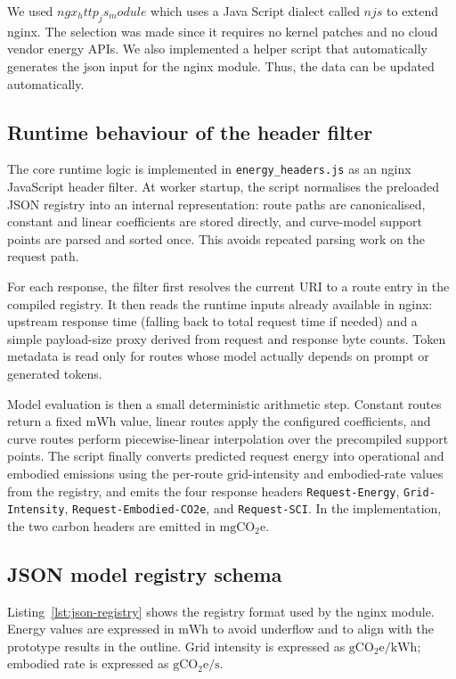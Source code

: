 We used $ngx_http_js_module$ which uses a Java Script dialect called $njs$ to extend nginx. The selection was made since it requires no kernel patches and no cloud vendor energy APIs. We also implemented a helper script that automatically generates the json input for the nginx module. Thus, the data can be updated automatically.

\subsection{Runtime behaviour of the header filter}
The core runtime logic is implemented in \texttt{energy\_headers.js} as an nginx JavaScript header filter. At worker startup, the script normalises the preloaded JSON registry into an internal representation: route paths are canonicalised, constant and linear coefficients are stored directly, and curve-model support points are parsed and sorted once. This avoids repeated parsing work on the request path.

For each response, the filter first resolves the current URI to a route entry in the compiled registry. It then reads the runtime inputs already available in nginx: upstream response time (falling back to total request time if needed) and a simple payload-size proxy derived from request and response byte counts. Token metadata is read only for routes whose model actually depends on prompt or generated tokens.

Model evaluation is then a small deterministic arithmetic step. Constant routes return a fixed \(\mathrm{mWh}\) value, linear routes apply the configured coefficients, and curve routes perform piecewise-linear interpolation over the precompiled support points. The script finally converts predicted request energy into operational and embodied emissions using the per-route grid-intensity and embodied-rate values from the registry, and emits the four response headers \texttt{Request-Energy}, \texttt{Grid-Intensity}, \texttt{Request-Embodied-CO2e}, and \texttt{Request-SCI}. In the implementation, the two carbon headers are emitted in \(\mathrm{mgCO_2e}\).

\subsection{JSON model registry schema}
Listing~\ref{lst:json-registry} shows the registry format used by the nginx module. Energy values are expressed in \(\mathrm{mWh}\) to avoid underflow and to align with the prototype results in the outline. Grid intensity is expressed as \(\mathrm{gCO_2e/kWh}\); embodied rate is expressed as \(\mathrm{gCO_2e/s}\).

